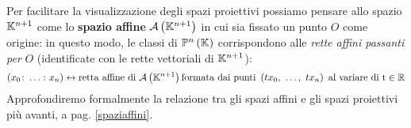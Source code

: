 \begin{intuit}
	Per facilitare la visualizzazione degli spazi proiettivi possiamo pensare allo spazio $\mathbb{K}^{n+1}$ come lo \textbf{spazio affine} $\mathcal{A}\left(\mathbb{K}^{n+1}\right)$ in cui sia fissato un punto $O$ come origine: in questo modo, le classi di $\proj[n]{\kamp}$ corrispondono alle \textit{rette affini passanti per} $O$ (identificate con le rette vettoriali di $\mathbb{K}^{n+1}$):
	\begin{equation*}
		\left(x_0\colon\ldots\colon x_n\right)\leftrightarrow\text{retta affine di }\mathcal{A}\left(\mathbb{K}^{n+1}\right)\text{formata dai punti }\left(tx_0,\ \ldots,\ tx_n\right)\text{ al variare di t}\in\mathbb{R}
	\end{equation*}
	Approfondiremo formalmente la relazione tra gli spazi affini e gli spazi proiettivi più avanti, a pag. \ref{spaziaffini}.
\end{intuit}
